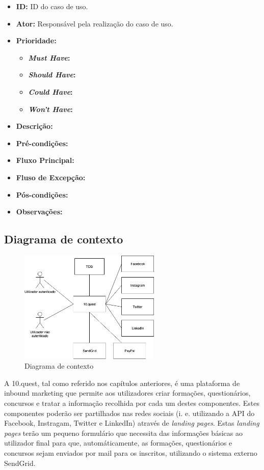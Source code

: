 \begin{itemize}
	\item \textbf{ID:} ID do caso de uso.
	\item \textbf{Ator:} Responsável pela realização do caso de uso.
	\item \textbf{Prioridade:} 
	\begin{itemize}
		\item \textbf{\textit{Must Have}:} 
		\item \textbf{\textit{Should Have}:}
		\item \textbf{\textit{Could Have}:}
		\item \textbf{\textit{Won't Have}:}
	\end{itemize}
	\item \textbf{Descrição:}
	\item \textbf{Pré-condições:}
	\item \textbf{Fluxo Principal:}
	\item \textbf{Fluso de Excepção:}
	\item \textbf{Pós-condições:}
	\item \textbf{Observações:}
\end{itemize}

\newpage

\subsection{Diagrama de contexto}
\label{d:contexto}
\begin{figure}[ht!]
	\begin{center}
		\includegraphics[width=0.6\textwidth]{img/rf/10quest}
		\caption{Diagrama de contexto}
		\label{fig:rf-10quest}
	\end{center}
\end{figure}

A 10.quest, tal como referido nos capítulos anteriores, é uma plataforma de inbound marketing que permite aos utilizadores criar formações, questionários, concursos e tratar a informação recolhida por cada um destes componentes. 
Estes componentes poderão ser partilhados nas redes sociais (i. e. utilizando a API do Facebook, Instragam, Twitter e LinkedIn) através de \textit{landing pages}. Estas \textit{landing pages} terão um pequeno formulário que necessita das informações básicas ao utilizador final para que, automáticamente, as formações, questionários e concursos sejam enviados por mail para os inscritos, utilizando o sistema externo SendGrid.

